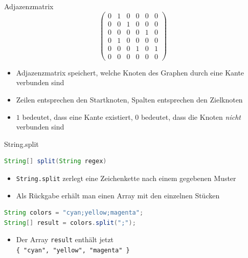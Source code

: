 \documentclass[18pt]{beamer}
\begin{document}
\begin{frame}{Adjazenzmatrix}
    \[
    \left(
    \begin{array}{cccccc}
        0 & 1 & 0 & 0 & 0 & 0 \\
        0 & 0 & 1 & 0 & 0 & 0 \\
        0 & 0 & 0 & 0 & 1 & 0 \\
        0 & 1 & 0 & 0 & 0 & 0 \\
        0 & 0 & 0 & 1 & 0 & 1 \\
        0 & 0 & 0 & 0 & 0 & 0
    \end{array}
    \right)
    \]

    \begin{itemize}
        \item Adjazenzmatrix speichert, welche Knoten des Graphen durch eine Kante verbunden sind
        \item Zeilen entsprechen den Startknoten, Spalten entsprechen den Zielknoten
        \item $1$ bedeutet, dass eine Kante existiert, $0$ bedeutet, dass die Knoten \textit{nicht} verbunden sind
    \end{itemize}

\end{frame}

\begin{frame}[fragile]{String.split}
    \begin{lstlisting}[language=Java]
String[] split(String regex)
    \end{lstlisting}


    \begin{itemize}
        \item \texttt{String.split} zerlegt eine Zeichenkette nach einem gegebenen Muster
        \item Als Rückgabe erhält man einen Array mit den einzelnen Stücken
    \end{itemize}

\begin{exampleblock}{}
    \begin{lstlisting}[language=Java,basicstyle=\scriptsize]
String colors = "cyan;yellow;magenta";
String[] result = colors.split(";");
    \end{lstlisting}
\end{exampleblock}

\begin{itemize}
    \item Der Array \texttt{result} enthält jetzt\\ \texttt{\{ "cyan", "yellow", "magenta" \}}
\end{itemize}

\end{frame}
\end{document}
